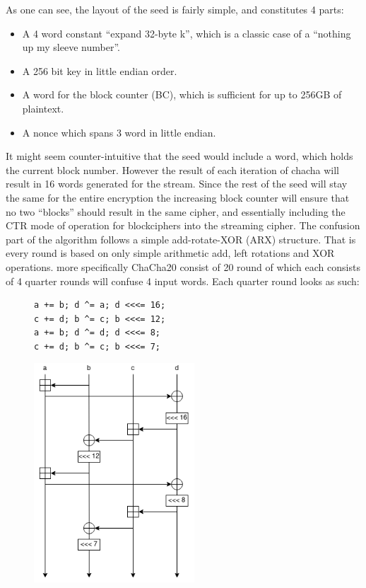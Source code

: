 \documentclass[a4paper]{article}
\begin{document}
\begin{enumerate}
As one can see, the layout of the seed is fairly simple, and constitutes 4 parts:
\begin{itemize}
\item A 4 word constant ``expand 32-byte k'', which is a classic case of a ``nothing up my sleeve number''.
\item A 256 bit key in little endian order.
\item A word for the block counter (BC), which is sufficient for up to 256GB of plaintext.
\item A nonce which spans 3 word in little endian.
\end{itemize}
It might seem counter-intuitive that the seed would include a word, which holds the current block number. However the result of each iteration of chacha will result in 16 words generated for the stream. Since the rest of the seed will stay the same for the entire encryption the increasing block counter will ensure that no two ``blocks'' should result in the same cipher, and essentially including the CTR mode of operation for blockciphers into the streaming cipher. The confusion part of the algorithm follows a simple add-rotate-XOR (ARX) structure. That is every round is based on only simple arithmetic add, left rotations and XOR operations. more specifically ChaCha20 consist of 20 round of which each consists of 4 quarter rounds will confuse 4 input words. Each quarter round looks as such:
\begin{figure}[!htb]
\begin{minipage}{0.4\textwidth}
\begin{verbatim}
a += b; d ^= a; d <<<= 16;
c += d; b ^= c; b <<<= 12;
a += b; d ^= d; d <<<= 8;
c += d; b ^= c; b <<<= 7;
\end{verbatim}
\end{minipage}
\qquad
\begin{minipage}{0.4\textwidth}
\includegraphics[width=6cm]{Background/ChaChaQR.png}

\end{minipage}
\end{figure}
\end{enumerate}
\end{document}
